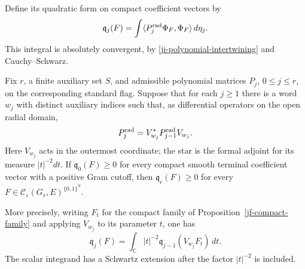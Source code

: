 Define its quadratic form on compact coefficient vectors by
\[
 \mathfrak q_j(F)=\int
       \langle P_j^{\rm rad}\Phi_F,\Phi_F\rangle\,d\eta_j.
\]
This integral is absolutely convergent, by
\eqref{ji-polynomial-intertwining} and Cauchy--Schwarz.

\begin{theorem}\label{ji-rank-descent}
Fix \(r\), a finite auxiliary set \(S\), and admissible polynomial
matrices \(P_j\), \(0\leq j\leq r\), on the corresponding
standard flag.  Suppose that for each \(j\geq1\) there is a word
\(w_j\) with distinct auxiliary indices such that, as differential
operators on the open radial domain,
\begin{equation}\label{ji-congruence}
 P_j^{\rm rad}=V_{w_j}^*P_{j-1}^{\rm rad}V_{w_j}.
\end{equation}
Here \(V_{w_j}\) acts in the outermost coordinate; the star is the
formal adjoint for its measure \(|t|^{-2}dt\).
If \(\mathfrak q_0(F)\geq0\) for every compact smooth terminal
coefficient vector with a positive Gram cutoff, then
\(\mathfrak q_r(F)\geq0\) for every
\(F\in\mathscr C_\varepsilon(G_r,E)^{\{0,1\}^S}\).

More precisely, writing \(F_t\) for the compact family of
Proposition~\ref{jf-compact-family} and applying \(V_{w_j}\)
to its parameter \(t\), one has
\begin{equation}\label{ji-positive-descent}
 \mathfrak q_j(F)=
   \int_{\mathbb C}|t|^{-2}
                    \mathfrak q_{j-1}(V_{w_j}F_t)\,dt.
\end{equation}
The scalar integrand has a Schwartz extension after the factor
\(|t|^{-2}\) is included.
\end{theorem}

